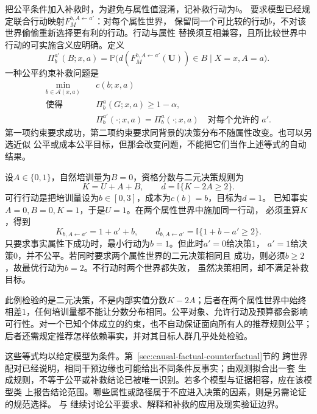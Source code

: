 把公平条件加入补救时，为避免与属性值混淆，记补救行动为\(b\)。
要求模型已经规定联合行动映射\(F_M^{b,A\leftarrow a'}\)：对每个属性世界，
保留同一个可比较的行动\(b\)，不对该世界偷偷重新选择更有利的行动。行动与属性
替换须互相兼容，且所比较世界中行动的可实施含义应明确。定义
\[
  \Pi_b^{a'}(B;x,a)
  =
  \mathbb P\bigl(
    d(F_M^{b,A\leftarrow a'}(\bm U))\in B
    \mid X=x,A=a
  \bigr).
\]
一种公平约束补救问题是
\begin{equation}
  \begin{aligned}
    \min_{b\in\mathcal A(x,a)}\quad &c(b;x,a)\\
    \text{使得}\quad
    &\Pi_b^a(G;x,a)\geq1-\alpha,\\
    &\Pi_b^{a'}(\cdot;x,a)=\Pi_b^a(\cdot;x,a)
      \quad\text{对每个允许的 }a'.
  \end{aligned}
  \label{eq:causal-fair-recourse-objective}
\end{equation}
第一项约束要求成功，第二项约束要求同背景的决策分布不随属性改变。也可以另选近似
公平或成本公平目标，但那会改变问题，不能把它们当作上述等式的自动结果。

\begin{example}[成功行动未必满足公平约束]
  \label{ex:causal-fair-recourse}
  设\(A\in\{0,1\}\)，自然培训量为\(B=0\)，资格分数与二元决策规则为
  \[
    K=U+A+B,\qquad d=\mathbb I\{K-2A\geq2\}.
  \]
  可行行动是把培训量设为\(b\in[0,3]\)，成本为\(c(b)=b\)，目标为\(d=1\)。
  已知事实\(A=0,B=0,K=1\)，于是\(U=1\)。在两个属性世界中施加同一行动，
  必须重算\(K\)，得到
  \[
    K_{b,A\leftarrow a'}=1+a'+b,\qquad
    d_{b,A\leftarrow a'}=\mathbb I\{1+b-a'\geq2\}.
  \]
  只要求事实属性下成功时，最小行动为\(b=1\)。但此时\(a'=0\)给决策\(1\)，
  \(a'=1\)给决策\(0\)，并不公平。若同时要求两个属性世界的二元决策相同且
  成功，则必须\(b\geq2\)，故最优行动为\(b=2\)。不行动时两个世界都失败，
  虽然决策相同，却不满足补救目标。
\end{example}

此例检验的是二元决策，不是内部实值分数\(K-2A\)；后者在两个属性世界中始终
相差\(1\)，任何培训量都不能让分数分布相同。公平对象、允许行动及预算都会影响
可行性。对一个已知个体成立的约束，也不自动保证面向所有人的推荐规则公平；
后者还需规定推荐怎样依赖事实，并对其目标人群几乎处处检验。

这些等式均以给定模型为条件。第~\ref{sec:causal-factual-counterfactual}节的
跨世界配对已经说明，相同干预边缘也可能给出不同条件反事实；由观测拟合出一套
生成规则，不等于公平或补救结论已被唯一识别。若多个模型与证据相容，应在该模型类
上报告结论范围。哪些属性或路径属于不应进入决策的因素，则是另需论证的规范选择。
与
继续讨论公平要求、解释和补救的应用及现实验证边界。

